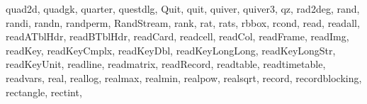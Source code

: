 {{        quad2d,%
        quadgk,%
        quarter,%
        questdlg,%
        Quit,%
        quit,%
        quiver,%
        quiver3,%
        qz,%
        rad2deg,%
        rand,%
        randi,%
        randn,%
        randperm,%
        RandStream,%
        rank,%
        rat,%
        rats,%
        rbbox,%
        rcond,%
        read,%
        readall,%
        readATblHdr,%
        readBTblHdr,%
        readCard,%
        readcell,%
        readCol,%
        readFrame,%
        readImg,%
        readKey,%
        readKeyCmplx,%
        readKeyDbl,%
        readKeyLongLong,%
        readKeyLongStr,%
        readKeyUnit,%
        readline,%
        readmatrix,%
        readRecord,%
        readtable,%
        readtimetable,%
        readvars,%
        real,%
        reallog,%
        realmax,%
        realmin,%
        realpow,%
        realsqrt,%
        record,%
        recordblocking,%
        rectangle,%
        rectint,%
}}

